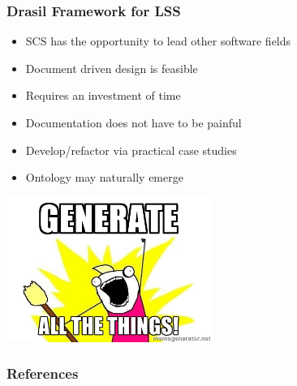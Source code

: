 \documentclass{beamer}
\begin{document}

\begin{frame}

\frametitle{Drasil Framework for LSS}

\begin{itemize}
\item SCS has the opportunity to lead other software fields%
\item Document driven design is feasible%
\item Requires an investment of time %
\item Documentation does not have to be painful
\item Develop/refactor via practical case studies
\item Ontology may naturally emerge
\end{itemize}

\includegraphics[width=0.5\textwidth]{../WG2_11/generate_all_the_things.jpg}


\end{frame}


\begin{frame}[allowframebreaks]
\frametitle{References}


\end{frame}

\end{document}
